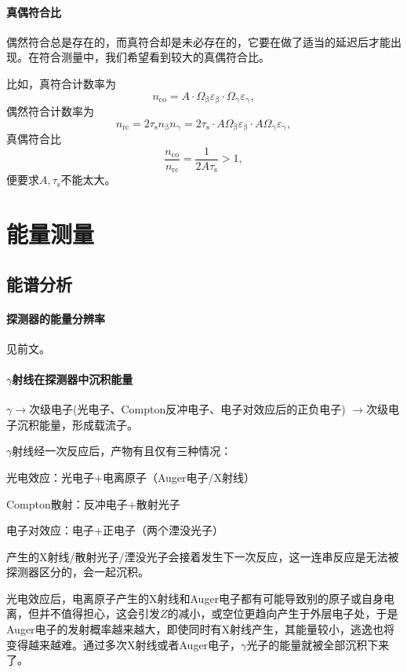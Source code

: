 \paragraph{真偶符合比}
偶然符合总是存在的，而真符合却是未必存在的，它要在做了适当的延迟后才能出现。在符合测量中，我们希望看到较大的真偶符合比。

比如，真符合计数率为
\begin{equation}\label{eq:nrd-true-beta-gamma-coincidences}
	n_{\mathrm{co}} = A \cdot \Omega_\upbeta\varepsilon_\upbeta \cdot \Omega_\upgamma\varepsilon_\upgamma,
\end{equation}
偶然符合计数率为
\[
	n_{\mathrm{rc}} = 2\tau_\mathrm s n_\upbeta n_\upgamma = 2\tau_\mathrm s \cdot A\Omega_\upbeta\varepsilon_\upbeta \cdot A\Omega_\upgamma\varepsilon_\upgamma,
\]
真偶符合比
\[
	\frac{n_{\mathrm{co}}}{n_{\mathrm{rc}}} = \frac1{2A\tau_\mathrm s} > 1,
\]
便要求$A,\tau_\mathrm s$不能太大。

\section{能量测量}

\subsection{\gammaray 能谱分析}

\paragraph{探测器的能量分辨率}见前文。
\paragraph{$\gamma$射线在探测器中沉积能量}
$\gamma \to$次级电子(光电子、Compton反冲电子、电子对效应后的正负电子) $\to$次级电子沉积能量，形成载流子。

$\gamma$射线经一次反应后，产物有且仅有三种情况：
\begin{compactitem}
	\item 光电效应：光电子+电离原子（Auger电子/X射线）
	\item Compton散射：反冲电子+散射光子
	\item 电子对效应：电子+正电子（两个湮没光子）
\end{compactitem}
产生的X射线/散射光子/湮没光子会接着发生下一次反应，这一连串反应是无法被探测器区分的，会一起沉积。

光电效应后，电离原子产生的X射线和Auger电子都有可能导致别的原子或自身电离，但并不值得担心，这会引发$Z$的减小，或空位更趋向产生于外层电子处，于是Auger电子的发射概率越来越大，即使同时有X射线产生，其能量较小，逃逸也将变得越来越难。通过多次X射线或者Auger电子，$\gamma$光子的能量就被全部沉积下来了。

